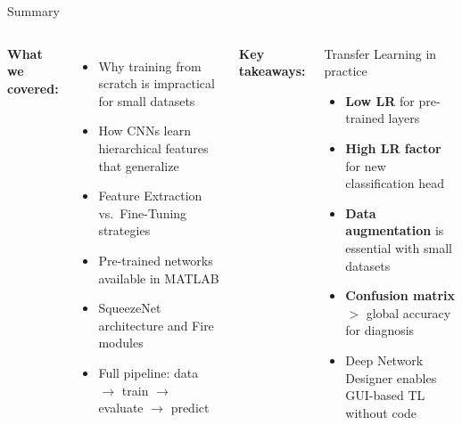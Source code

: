 \documentclass[aspectratio=169,xcolor=dvipsnames]{beamer}
\begin{document}
\begin{frame}{Summary}
    \begin{columns}
        \textbf{What we covered:}
        \begin{itemize}
            \item Why training from scratch is impractical for small datasets
            \item How CNNs learn hierarchical features that generalize
            \item Feature Extraction vs.\ Fine-Tuning strategies
            \item Pre-trained networks available in MATLAB
            \item SqueezeNet architecture and Fire modules
            \item Full pipeline: data $\to$ train $\to$ evaluate $\to$ predict
        \end{itemize}
        \textbf{Key takeaways:}
        \begin{block}{Transfer Learning in practice}
            \begin{itemize}
                \item \textbf{Low LR} for pre-trained layers
                \item \textbf{High LR factor} for new classification head
                \item \textbf{Data augmentation} is essential with small datasets
                \item \textbf{Confusion matrix} $>$ global accuracy for diagnosis
                \item Deep Network Designer enables GUI-based TL without code
            \end{itemize}
        \end{block}
    \end{columns}
\end{frame}
\end{document}
